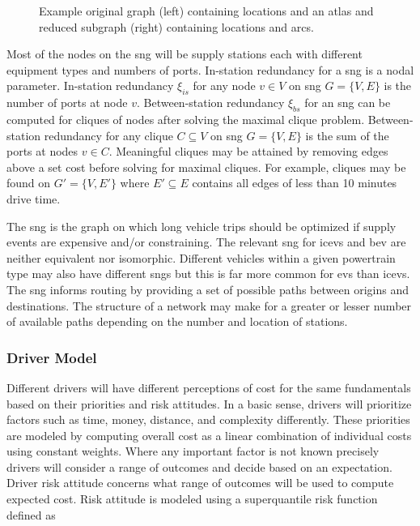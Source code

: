 \documentclass[11pt]{article}
\begin{document}
\begin{multicols}{2}
\begin{figure}[H]
\begin{subfigure}[t]{.5\linewidth}
	\end{subfigure}
	\caption{Example original graph (left) containing locations and an atlas and reduced subgraph (right) containing locations and arcs.}
	\label{fig:reduced_subgraph}
\end{figure}

Most of the nodes on the \gls{sng} will be supply stations each with different equipment types and numbers of ports. In-station redundancy for a \gls{sng} is a nodal parameter. In-station redundancy $\xi_{is}$ for any node $v \in V$ on \gls{sng} $G = \{V, E\}$ is the number of ports at node $v$. Between-station redundancy $\xi_{bs}$ for an \gls{sng} can be computed for cliques of nodes after solving the maximal clique problem. Between-station redundancy for any clique $C \subseteq V$ on \gls{sng} $G = \{V, E\}$ is the sum of the ports at nodes $v \in C$. Meaningful cliques may be attained by removing edges above a set cost before solving for maximal cliques. For example, cliques may be found on $G' = \{V, E'\}$ where $E' \subseteq E$ contains all edges of less than 10 minutes drive time.

The \gls{sng} is the graph on which long vehicle trips should be optimized if supply events are expensive and/or constraining. The relevant \gls{sng} for \glspl{icev} and \gls{bev} are neither equivalent nor isomorphic. Different vehicles within a given powertrain type may also have different \glspl{sng} but this is far more common for \glspl{ev} than \glspl{icev}. The \gls{sng} informs routing by providing a set of possible paths between origins and destinations. The structure of a network may make for a greater or lesser number of available paths depending on the number and location of stations.

\subsubsection*{Driver Model}

Different drivers will have different perceptions of cost for the same fundamentals based on their priorities and risk attitudes. In a basic sense, drivers will prioritize factors such as time, money, distance, and complexity differently. These priorities are modeled by computing overall cost as a linear combination of individual costs using constant weights. Where any important factor is not known precisely drivers will consider a range of outcomes and decide based on an expectation. Driver risk attitude concerns what range of outcomes will be used to compute expected cost. Risk attitude is modeled using a superquantile risk function defined as


\end{multicols}
\end{document}
